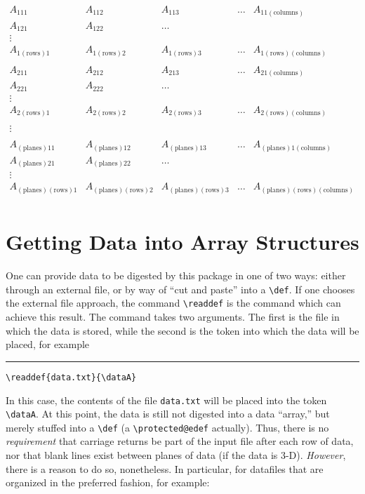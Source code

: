 \documentclass{article}
\newcommand\rl{\rule{1em}{0in}}
\let\vb\verb
\newcommand\margcmd[1]{\marginpar{\hfill\ttfamily\char'134#1}}
\begin{document}
\(
\begin{array}{lllll}
A_{111} &A_{112} &A_{113} & \ldots & A_{11\mathrm{(columns)}} \\
A_{121} &A_{122} & \ldots && \\
\vdots&&&&\\
A_{1\mathrm{(rows)}1} &A_{1\mathrm{(rows)}2} &A_{1\mathrm{(rows)}3} & 
                     \ldots & A_{1\mathrm{(rows)}\mathrm{(columns)}} \\
&&&&\\
A_{211} &A_{212} &A_{213} & \ldots & A_{21\mathrm{(columns)}} \\
A_{221} &A_{222} & \ldots && \\
\vdots&&&&\\
A_{2\mathrm{(rows)}1} &A_{2\mathrm{(rows)}2} &A_{2\mathrm{(rows)}3} & 
                     \ldots & A_{2\mathrm{(rows)}\mathrm{(columns)}} \\
&&&&\\
\vdots&&&&\\
&&&&\\
A_{\mathrm{(planes)}11} &A_{\mathrm{(planes)}12} &A_{\mathrm{(planes)}13} & \ldots & A_{\mathrm{(planes)}1\mathrm{(columns)}} \\
A_{\mathrm{(planes)}21} &A_{\mathrm{(planes)}22} & \ldots && \\
\vdots&&&&\\
A_{\mathrm{(planes)}\mathrm{(rows)}1} &A_{\mathrm{(planes)}\mathrm{(rows)}2} &A_{\mathrm{(planes)}\mathrm{(rows)}3} & 
                     \ldots & A_{\mathrm{(planes)}\mathrm{(rows)}\mathrm{(columns)}} \\
\end{array}
\)

\section{Getting Data into Array Structures\label{s:ex}}

One can provide data to be digested by this package in one of two ways:
either through an external file, or by way of ``cut and paste'' into a
\vb|\def|.  If one chooses the external file approach, the command
\vb|\readdef|\margcmd{readdef} is the command which can achieve this
result.  The command takes two arguments.  The first is the file in
which the data is stored, while the second is the token into which the
data will be placed, for example

\rl\vb|\readdef{data.txt}{\dataA}|

In this case, the contents of the file \vb|data.txt| will be placed
into the token \vb|\dataA|.  At this point, the data is still not
digested into a data ``array,'' but merely stuffed into a \vb|\def| (a
\vb|\protected@edef| actually).  Thus, there is no
\textit{requirement} that carriage returns be part of the input file
after each row of data, nor that blank lines exist between planes of
data (if the data is 3-D). \textit{However}, there is a reason to do so,
nonetheless.  In particular, for datafiles that are organized in the
preferred fashion, for example:
\end{document}

